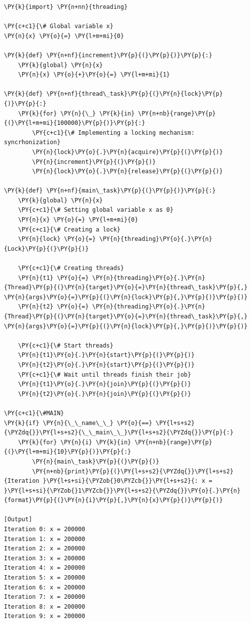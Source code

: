 \begin{Verbatim}[label=\makebox{\url{https://github.com/lucabaldini/cmepda/tree/master/slides/latex/snippets/threading_lock.py}},commandchars=\\\{\}]
\PY{k}{import} \PY{n+nn}{threading}

\PY{c+c1}{\# Global variable x}
\PY{n}{x} \PY{o}{=} \PY{l+m+mi}{0}

\PY{k}{def} \PY{n+nf}{increment}\PY{p}{(}\PY{p}{)}\PY{p}{:}
    \PY{k}{global} \PY{n}{x}
    \PY{n}{x} \PY{o}{+}\PY{o}{=} \PY{l+m+mi}{1}

\PY{k}{def} \PY{n+nf}{thread\_task}\PY{p}{(}\PY{n}{lock}\PY{p}{)}\PY{p}{:}
    \PY{k}{for} \PY{n}{\_} \PY{k}{in} \PY{n+nb}{range}\PY{p}{(}\PY{l+m+mi}{100000}\PY{p}{)}\PY{p}{:}
        \PY{c+c1}{\# Implementing a locking mechanism: syncrhonization}
        \PY{n}{lock}\PY{o}{.}\PY{n}{acquire}\PY{p}{(}\PY{p}{)}
        \PY{n}{increment}\PY{p}{(}\PY{p}{)}
        \PY{n}{lock}\PY{o}{.}\PY{n}{release}\PY{p}{(}\PY{p}{)}

\PY{k}{def} \PY{n+nf}{main\_task}\PY{p}{(}\PY{p}{)}\PY{p}{:}
    \PY{k}{global} \PY{n}{x}
    \PY{c+c1}{\# Setting global variable x as 0}
    \PY{n}{x} \PY{o}{=} \PY{l+m+mi}{0}
    \PY{c+c1}{\# Creating a lock}
    \PY{n}{lock} \PY{o}{=} \PY{n}{threading}\PY{o}{.}\PY{n}{Lock}\PY{p}{(}\PY{p}{)}

    \PY{c+c1}{\# Creating threads}
    \PY{n}{t1} \PY{o}{=} \PY{n}{threading}\PY{o}{.}\PY{n}{Thread}\PY{p}{(}\PY{n}{target}\PY{o}{=}\PY{n}{thread\_task}\PY{p}{,} \PY{n}{args}\PY{o}{=}\PY{p}{(}\PY{n}{lock}\PY{p}{,}\PY{p}{)}\PY{p}{)}
    \PY{n}{t2} \PY{o}{=} \PY{n}{threading}\PY{o}{.}\PY{n}{Thread}\PY{p}{(}\PY{n}{target}\PY{o}{=}\PY{n}{thread\_task}\PY{p}{,} \PY{n}{args}\PY{o}{=}\PY{p}{(}\PY{n}{lock}\PY{p}{,}\PY{p}{)}\PY{p}{)}

    \PY{c+c1}{\# Start threads}
    \PY{n}{t1}\PY{o}{.}\PY{n}{start}\PY{p}{(}\PY{p}{)}
    \PY{n}{t2}\PY{o}{.}\PY{n}{start}\PY{p}{(}\PY{p}{)}
    \PY{c+c1}{\# Wait until threads finish their job}
    \PY{n}{t1}\PY{o}{.}\PY{n}{join}\PY{p}{(}\PY{p}{)}
    \PY{n}{t2}\PY{o}{.}\PY{n}{join}\PY{p}{(}\PY{p}{)}

\PY{c+c1}{\#MAIN}
\PY{k}{if} \PY{n}{\_\_name\_\_} \PY{o}{==} \PY{l+s+s2}{\PYZdq{}}\PY{l+s+s2}{\_\_main\_\_}\PY{l+s+s2}{\PYZdq{}}\PY{p}{:}
    \PY{k}{for} \PY{n}{i} \PY{k}{in} \PY{n+nb}{range}\PY{p}{(}\PY{l+m+mi}{10}\PY{p}{)}\PY{p}{:}
        \PY{n}{main\_task}\PY{p}{(}\PY{p}{)}
        \PY{n+nb}{print}\PY{p}{(}\PY{l+s+s2}{\PYZdq{}}\PY{l+s+s2}{Iteration }\PY{l+s+si}{\PYZob{}0\PYZcb{}}\PY{l+s+s2}{: x = }\PY{l+s+si}{\PYZob{}1\PYZcb{}}\PY{l+s+s2}{\PYZdq{}}\PY{o}{.}\PY{n}{format}\PY{p}{(}\PY{n}{i}\PY{p}{,}\PY{n}{x}\PY{p}{)}\PY{p}{)}

[Output]
Iteration 0: x = 200000
Iteration 1: x = 200000
Iteration 2: x = 200000
Iteration 3: x = 200000
Iteration 4: x = 200000
Iteration 5: x = 200000
Iteration 6: x = 200000
Iteration 7: x = 200000
Iteration 8: x = 200000
Iteration 9: x = 200000
\end{Verbatim}